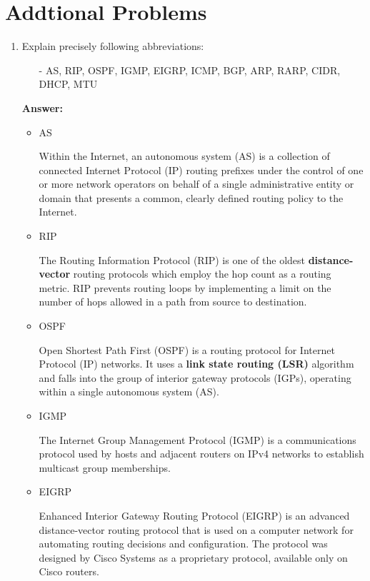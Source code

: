 
\section{Addtional Problems}

\begin{enumerate}
    \item Explain precisely following abbreviations:
    \begin{itemize}
        \item[-] AS, RIP, OSPF, IGMP, EIGRP, ICMP, BGP, ARP, RARP, CIDR, DHCP, MTU
    \end{itemize}
    \textbf{Answer:}

    \begin{itemize}
        \item AS

        Within the Internet, an autonomous system (AS) is a collection of connected Internet Protocol (IP) routing prefixes under the control of one or more network operators on behalf of a single administrative entity or domain that presents a common, clearly defined routing policy to the Internet.

        \item RIP

        The Routing Information Protocol (RIP) is one of the oldest \textbf{distance-vector} routing protocols which employ the hop count as a routing metric. RIP prevents routing loops by implementing a limit on the number of hops allowed in a path from source to destination.

        \item OSPF

        Open Shortest Path First (OSPF) is a routing protocol for Internet Protocol (IP) networks. It uses a \textbf{link state routing (LSR)} algorithm and falls into the group of interior gateway protocols (IGPs), operating within a single autonomous system (AS).

        \item IGMP

        The Internet Group Management Protocol (IGMP) is a communications protocol used by hosts and adjacent routers on IPv4 networks to establish multicast group memberships.

        \item EIGRP

        Enhanced Interior Gateway Routing Protocol (EIGRP) is an advanced distance-vector routing protocol that is used on a computer network for automating routing decisions and configuration. The protocol was designed by Cisco Systems as a proprietary protocol, available only on Cisco routers.


\end{itemize}
\end{enumerate}
